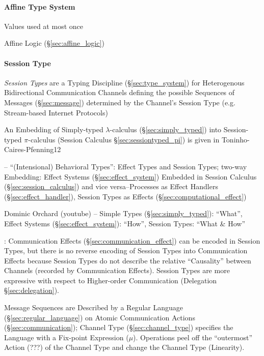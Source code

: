 \paragraph{Affine Type System}\label{sec:affine_type}\hfill

Values used at most once

Affine Logic (\S\ref{sec:affine_logic})



\paragraph{Session Type}\label{sec:session_type}\hfill

\emph{Session Types} are a Typing Discipline (\S\ref{sec:type_system})
for Heterogenous Bidirectional Communication Channels defining the
possible Sequences of Messages (\S\ref{sec:message}) determined by the
Channel's Session Type (e.g. Stream-based Internet Protocols)
\cite{neubauer-thiemann04}

An Embedding of Simply-typed $\lambda$-calculus
(\S\ref{sec:simply_typed}) into Session-typed $\pi$-calculus (Session
Calculus \S\ref{sec:sessiontyped_pi}) is given in
Toninho-Caires-Pfenning12 \cite{caires-pfenning-toninho12}

\cite{orchard-yoshida16} -- ``(Intensional) Behavioral Types'': Effect
Types and Session Types; two-way Embedding: Effect Systems
(\S\ref{sec:effect_system}) Embedded in Session Calculus
(\S\ref{sec:session_calculus}) and vice versa--Processes as Effect
Handlers (\S\ref{sec:effect_handler}), Session Types as Effects
(\S\ref{sec:computational_effect})

Dominic Orchard (youtube) -- Simple Types (\S\ref{sec:simply_typed}):
``What'', Effect Systems (\S\ref{sec:effect_system}): ``How'', Session
Types: ``What \& How''

\cite{orchard-yoshida16}: Communication Effects
(\S\ref{sec:communication_effect}) can be encoded in Session Types,
but there is no reverse encoding of Session Types into Communication
Effects because Session Types do not describe the relative
``Causality'' between Channels (recorded by Communication Effects).
Session Types are more expressive with respect to Higher-order
Communication (Delegation \S\ref{sec:delegation}).

Message Sequences are Described by a Regular Language
(\S\ref{sec:regular_language}) on Atomic Communication Actions
(\S\ref{sec:communication}); Channel Type (\S\ref{sec:channel_type})
specifies the Language with a Fix-point Expression ($\mu$). Operations
peel off the ``outermost'' Action (???) of the Channel Type and change
the Channel Type (Linearity). \cite{neubauer-thiemann04}

